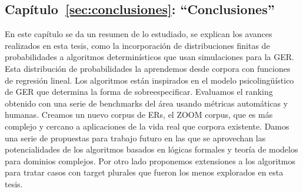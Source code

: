 \subsection{Cap\'itulo~\ref{sec:conclusiones}: ``Conclusiones''} En este cap\'itulo se da un resumen de lo estudiado, se explican los avances realizados en esta tesis, como la incorporaci\'on de distribuciones finitas de probabilidades a algoritmos determin\'isticos que usan simulaciones para la GER. Esta distribuci\'on de probabilidades la aprendemos desde corpora con funciones de regresi\'on lineal. Los algoritmos est\'an inspirados en el modelo psicoling\"u\'istico de GER que determina la forma de sobreespecificar. Evaluamos el ranking obtenido con una serie de benchmarks del \'area usando m\'etricas autom\'aticas y humanas. Creamos un nuevo corpus de ERs, el ZOOM corpus, que es m\'as complejo y cercano a aplicaciones de la vida real que corpora existente. Damos una serie de propuestas para trabajo futuro en las que se aprovechan las potencialidades de los algoritmos basados en l\'ogicas formales y teor\'ia de modelos para dominios complejos. Por otro lado proponemos extensiones a los algoritmos para tratar casos con target plurales que fueron los menos explorados en esta tesis.


